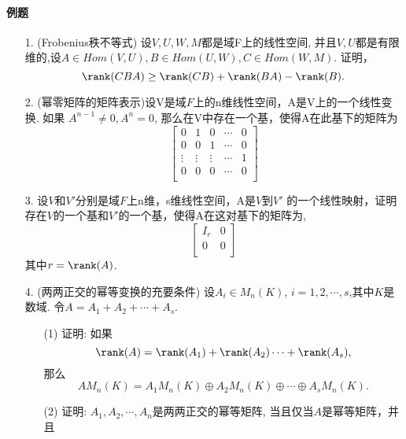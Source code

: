 \paragraph{例题}
\begin{itemize}
    \item [1.] (Frobenius秩不等式) 设$V,U,W,M$都是域F上的线性空间,
    并且$V,U$都是有限维的,设$A \in Hom(V,U), B \in Hom(U,W), C \in Hom(W,M)$.
    证明，$$\rank(CBA) \ge \rank(CB) + \rank(BA) - \rank(B).$$
    \vspace{2cm}
    \item [2.] (幂零矩阵的矩阵表示)设V是域$F$上的n维线性空间，A是V上的一个线性变换. 如果
    $A^{n-1} \ne 0, A^n = 0$, 那么在V中存在一个基，使得A在此基下的矩阵为
    \begin{equation}
    \nonumber
    \begin{bmatrix}
        0& 1& 0& \cdots &0\\
        0& 0& 1& \cdots &0\\
        \vdots& \vdots& \vdots& \cdots & 1\\
        0& 0& 0& \cdots &0\\
    \end{bmatrix}
    \end{equation}
    \vspace{3cm}
    \item [3.] 设$V$和$V'$分别是域$F$上n维，s维线性空间，A是$V$到$V'$
    的一个线性映射，证明存在$V$的一个基和$V'$的一个基，使得A在这对基下的矩阵为,
    \begin{equation}
    \nonumber
    \begin{bmatrix}
        I_r& 0\\
        0&   0\\
    \end{bmatrix}
    \end{equation}
    其中$r = \rank(A)$.
    \vspace{3cm}
    \item [4.](两两正交的幂等变换的充要条件)
    设$A_i \in M_n(K)$, $i=1,2,\cdots,s$,其中$K$是数域.
    令$A=A_1 + A_2 +\cdots + A_s$.
    \begin{itemize}
        \item[(1) ] 证明: 如果
              $$ \rank(A) = \rank(A_1) + \rank(A_2) \cdots + \rank(A_s),$$
              那么
              $$AM_n(K) = A_1M_n(K) \oplus A_2M_n(K) \oplus \cdots \oplus A_s M_n(K).$$
        \item [(2) ] 证明: $A_1, A_2, \cdots, A_n$是两两正交的幂等矩阵,
              当且仅当$A$是幂等矩阵，并且

\end{itemize}
\end{itemize}
